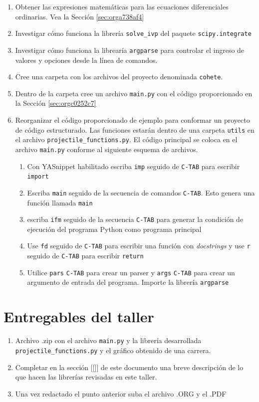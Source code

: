 \documentclass{article}
\begin{document}
\begin{enumerate}
\item Obtener las expresiones matemáticas para las ecuaciones
diferenciales ordinarias. Vea la Sección \ref{sec:orga738af4}
\item Investigar cómo funciona la librería \texttt{solve\_ivp} del paquete
\texttt{scipy.integrate}
\item Investigar cómo funciona la librearía \texttt{argparse} para controlar el
ingreso de valores y opciones desde la línea de comandos.
\item Cree una carpeta con los archivos del proyecto denominada \texttt{cohete}.
\item Dentro de la carpeta cree un archivo \texttt{main.py} con el código
proporcionado en la Sección \ref{sec:orgc0252c7}
\item Reorganizar el código proporcionado de ejemplo para conformar un
proyecto de código estructurado. Las funciones estarán dentro de
una carpeta \texttt{utils} en el archivo \texttt{projectile\_functions.py}. El
código principal se coloca en el archivo \texttt{main.py} conforme al
siguiente esquema de archivos.
\begin{enumerate}
\item Con YASnippet habilitado escriba \texttt{imp} seguido de \texttt{C-TAB} para
escribir \texttt{import}
\item Escriba \texttt{main} seguido de la secuencia
de comandos \texttt{C-TAB}. Esto genera una función llamada \texttt{main}
\item escriba \texttt{ifm} seguido de la secuencia \texttt{C-TAB} para generar la
condición de ejecución del programa Python como programa
principal
\item Use \texttt{fd} seguido de \texttt{C-TAB} para escribir una función con
\emph{docstrings} y use \texttt{r} seguido de \texttt{C-TAB} para escribir \texttt{return}
\item Utilice \texttt{pars} \texttt{C-TAB} para crear un parser y \texttt{args} \texttt{C-TAB}
para crear un argumento de entrada del programa. Importe la
librería \texttt{argparse}
\end{enumerate}
\end{enumerate}

\section{Entregables del taller}
\label{sec:org9ce9924}
\begin{enumerate}
\item Archivo .zip con el archivo \texttt{main.py} y la librería desarrollada
\texttt{projectile\_functions.py} y el gráfico obtenido de una carrera.
\item Completar en la sección [[]] de este documento una breve
descripción de lo que hacen las librerías revisadas en este taller.
\item Una vez redactado el punto anterior suba el archivo .ORG y el .PDF
\end{enumerate}
\end{document}
